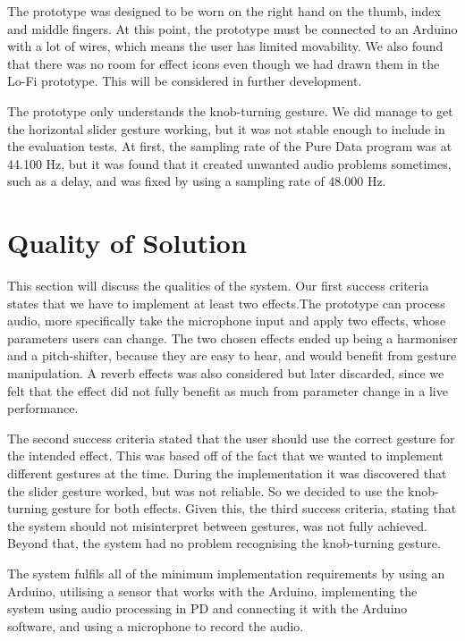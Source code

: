 The prototype was designed to be worn on the right hand on the thumb, index and middle fingers. At this point, the prototype must be connected to an Arduino with a lot of wires, which means the user has limited movability. We also found that there was no room for effect icons even though we had drawn them in the Lo-Fi prototype. This will be considered in further development.

The prototype only understands the knob-turning gesture. We did manage to get the horizontal slider gesture working, but it was not stable enough to include in the evaluation tests. At first, the sampling rate of the Pure Data program was at 44.100 Hz, but it was found that it created unwanted audio problems sometimes, such as a delay, and was fixed by using a sampling rate of 48.000 Hz.

\section{Quality of Solution}

This section will discuss the qualities of the system. Our first success criteria states that we have to implement at least two effects.The prototype can process audio, more specifically take the microphone input and apply two effects, whose parameters users can change. The two chosen effects ended up being a harmoniser and a pitch-shifter, because they are easy to hear, and would benefit from gesture manipulation. A reverb effects was also considered but later discarded, since we felt that the effect did not fully benefit as much from parameter change in a live performance.

The second success criteria stated that the user should use the correct gesture for the intended effect. This was based off of the fact that we wanted to implement different gestures at the time. During the implementation it was discovered that the slider gesture worked, but was not reliable. So we decided to use the knob-turning gesture for both effects. Given this, the third success criteria, stating that the system should not misinterpret between gestures, was not fully achieved. Beyond that, the system had no problem recognising the knob-turning gesture.

The system fulfils all of the minimum implementation requirements by using an Arduino, utilising a sensor that works with the Arduino, implementing the system using audio processing in PD and connecting it with the Arduino software, and using a microphone to record the audio.

